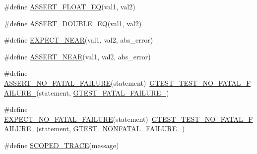\begin{DoxyCompactItemize}
\item 
\#define \mbox{\hyperlink{googletest-master_2googletest_2include_2gtest_2gtest_8h_a4663ffbf844baa54bdb29f9148fd0f96}{A\+S\+S\+E\+R\+T\+\_\+\+F\+L\+O\+A\+T\+\_\+\+EQ}}(val1,  val2)
\item 
\#define \mbox{\hyperlink{googletest-master_2googletest_2include_2gtest_2gtest_8h_a6617da62e5ae5490995a3bfca1f331a9}{A\+S\+S\+E\+R\+T\+\_\+\+D\+O\+U\+B\+L\+E\+\_\+\+EQ}}(val1,  val2)
\item 
\#define \mbox{\hyperlink{googletest-master_2googletest_2include_2gtest_2gtest_8h_a88cd7978af0e7dbd42cd606dfabdcc6f}{E\+X\+P\+E\+C\+T\+\_\+\+N\+E\+AR}}(val1,  val2,  abs\+\_\+error)
\item 
\#define \mbox{\hyperlink{googletest-master_2googletest_2include_2gtest_2gtest_8h_a73cce6b752d204f91a36bef2f8e663b3}{A\+S\+S\+E\+R\+T\+\_\+\+N\+E\+AR}}(val1,  val2,  abs\+\_\+error)
\item 
\#define \mbox{\hyperlink{googletest-master_2googletest_2include_2gtest_2gtest_8h_a5034fda3490aad5a93942ac83f4cea49}{A\+S\+S\+E\+R\+T\+\_\+\+N\+O\+\_\+\+F\+A\+T\+A\+L\+\_\+\+F\+A\+I\+L\+U\+RE}}(statement)~\mbox{\hyperlink{_obj__test_2lib_2googletest-release-1_88_81_2googletest_2include_2gtest_2internal_2gtest-internal_8h_a1b37a3c446836d33040f3266a6236081}{G\+T\+E\+S\+T\+\_\+\+T\+E\+S\+T\+\_\+\+N\+O\+\_\+\+F\+A\+T\+A\+L\+\_\+\+F\+A\+I\+L\+U\+R\+E\+\_\+}}(statement, \mbox{\hyperlink{_obj__test_2lib_2googletest-release-1_88_81_2googletest_2include_2gtest_2internal_2gtest-internal_8h_a0f9a4c3ea82cc7bf4478eaffdc168358}{G\+T\+E\+S\+T\+\_\+\+F\+A\+T\+A\+L\+\_\+\+F\+A\+I\+L\+U\+R\+E\+\_\+}})
\item 
\#define \mbox{\hyperlink{googletest-master_2googletest_2include_2gtest_2gtest_8h_a067c02ccaf3171d6e1781cd0f8cdcf74}{E\+X\+P\+E\+C\+T\+\_\+\+N\+O\+\_\+\+F\+A\+T\+A\+L\+\_\+\+F\+A\+I\+L\+U\+RE}}(statement)~\mbox{\hyperlink{_obj__test_2lib_2googletest-release-1_88_81_2googletest_2include_2gtest_2internal_2gtest-internal_8h_a1b37a3c446836d33040f3266a6236081}{G\+T\+E\+S\+T\+\_\+\+T\+E\+S\+T\+\_\+\+N\+O\+\_\+\+F\+A\+T\+A\+L\+\_\+\+F\+A\+I\+L\+U\+R\+E\+\_\+}}(statement, \mbox{\hyperlink{_obj__test_2lib_2googletest-release-1_88_81_2googletest_2include_2gtest_2internal_2gtest-internal_8h_a6cb7482cfa03661a91c698eb5895f642}{G\+T\+E\+S\+T\+\_\+\+N\+O\+N\+F\+A\+T\+A\+L\+\_\+\+F\+A\+I\+L\+U\+R\+E\+\_\+}})
\item 
\#define \mbox{\hyperlink{googletest-master_2googletest_2include_2gtest_2gtest_8h_a4dac08f15adc8cb1ee0e5c1bfb0f440d}{S\+C\+O\+P\+E\+D\+\_\+\+T\+R\+A\+CE}}(message)

\end{DoxyCompactItemize}
